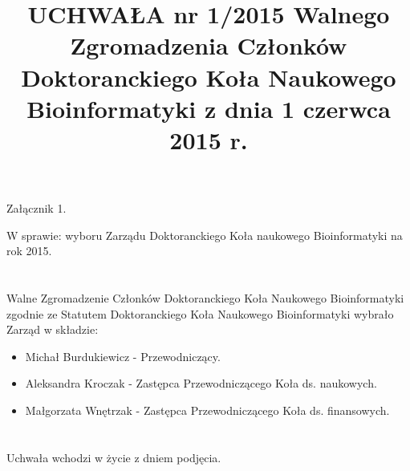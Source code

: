 \documentclass{article}
\title{UCHWAŁA nr 1/2015 Walnego Zgromadzenia Członków Doktoranckiego Koła Naukowego Bioinformatyki z dnia 1 czerwca 2015 r.}
\date{}
\begin{document}
\hfill Załącznik 1.
{\let\newpage\relax\maketitle}


\maketitle

W sprawie: wyboru Zarządu Doktoranckiego Koła naukowego Bioinformatyki na rok 2015.

\section{}

Walne Zgromadzenie Członków Doktoranckiego Koła Naukowego Bioinformatyki zgodnie ze Statutem Doktoranckiego Koła Naukowego Bioinformatyki wybrało Zarząd w składzie:
  \begin{itemize}
    \item Michał Burdukiewicz - Przewodniczący.
    \item Aleksandra Kroczak - Zastępca Przewodniczącego Koła ds. naukowych.
    \item Małgorzata Wnętrzak - Zastępca Przewodniczącego Koła ds. finansowych.
  \end{itemize}
  
\section{}
Uchwała wchodzi w życie z dniem podjęcia.
\end{document}
